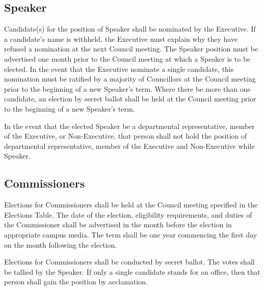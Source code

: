 \subsection{Speaker}
\begin{longenum}[ label*=\thesubsection.\arabic*., align=left]
	\item Candidate(s) for the position of Speaker shall be nominated by the Executive.    If a candidate's name is withheld, the Executive must explain why they have refused a nomination at the next Council meeting. The Speaker position must be advertised one month prior to the Council meeting at which a Speaker is to be elected.   In the event that the Executive nominate a single candidate, this nomination must be ratified by a majority of Councillors at the Council meeting prior to the beginning of a new Speaker's term. Where there be more than one candidate, an election by secret ballot shall be held at the Council meeting prior to the beginning of a new Speaker's term.

	\item In the event that the elected Speaker be a departmental representative, member of the Executive, or Non-Executive, that person shall not hold the position of departmental representative, member of the Executive and Non-Executive while Speaker.
\end{longenum}

\subsection{Commissioners}
\begin{longenum}[ label*=\thesubsection.\arabic*., align=left]
\item Elections for Commissioners shall be held at the Council meeting specified in the Elections Table. The date of the election, eligibility requirements, and duties of the Commissioner shall be advertised in the month before the election in appropriate campus media. The term shall be one year commencing the first day on the month following the election.
 
\item Elections for Commissioners shall be conducted by secret ballot. The votes shall be tallied by the Speaker. If only a single candidate stands for an office, then that person shall gain the position by acclamation.
 
\end{longenum}
\newpage

